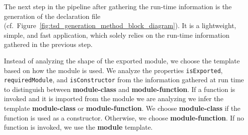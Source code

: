 \documentclass[english,cleveref,autoref,submission]{programming}
\newcommand{\figref}[1]{Figure~\ref{#1}}
\begin{document}
The next step in the pipeline after gathering the run-time information is
the generation of the declaration file (cf.\
\figref{fig:tsd_generation_method_block_diagram}). It is a lightweight,
simple, and fast application, which solely relies on the run-time
information gathered in the previous step.

Instead of analyzing the shape of the exported module, we choose the
template based on how the module is used. We analyze the properties \texttt{isExported},
\texttt{requiredModule}, and \texttt{isConstructor} from the
information gathered at run time to distinguish
between \textbf{module-class} and \textbf{module-function}. If a function is invoked and
it is imported from the module we are analyzing we infer the template
\textbf{module-class} or \textbf{module-function}. We choose \textbf{module-class} if the
function is used as a constructor. Otherwise, we choose
\textbf{module-function}.
If no function is invoked, we use the \textbf{module}
template.




\end{document}
